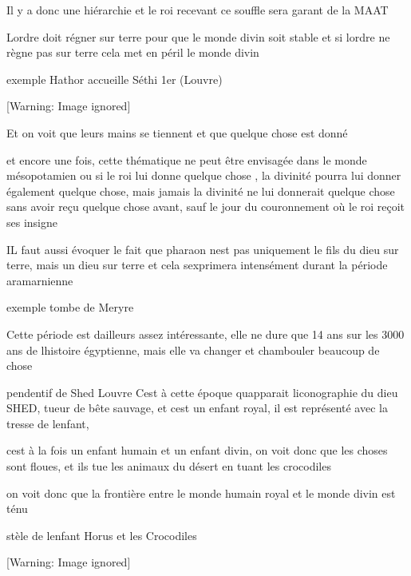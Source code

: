 \documentclass{article}
\begin{document}
Il y a donc une hiérarchie et le roi recevant ce souffle sera garant de
la MAAT

L{\textquotesingle}ordre doit régner sur terre pour que le monde divin
soit stable et si l{\textquotesingle}ordre ne règne pas sur terre cela
met en péril le monde divin

exemple Hathor accueille Séthi 1er (Louvre)

  [Warning: Image ignored] %
 

Et on voit que leurs mains se tiennent et que quelque chose est donné

et encore une fois, cette thématique ne peut être envisagée dans le
monde mésopotamien ou si le roi lui donne quelque chose , la divinité
pourra lui donner également quelque chose,  mais jamais la divinité ne
lui donnerait quelque chose sans avoir reçu quelque chose avant, sauf
le jour du couronnement où le roi reçoit ses insigne

IL faut aussi évoquer le fait que pharaon n{\textquotesingle}est pas
uniquement le fils du dieu sur terre, mais un dieu sur terre  et cela
s{\textquotesingle}exprimera intensément durant la période aramarnienne


exemple tombe de Meryre

Cette période est d{\textquotesingle}ailleurs assez intéressante, elle
ne dure que 14 ans sur les 3000 ans de l{\textquotesingle}histoire
égyptienne, mais elle va changer et chambouler beaucoup de chose

pendentif de Shed Louvre  C{\textquotesingle}est à cette époque
qu{\textquotesingle}apparait l{\textquotesingle}iconographie du dieu
SHED, tueur de bête sauvage, et c{\textquotesingle}est un enfant royal,
il est représenté avec la tresse de l{\textquotesingle}enfant, 

c{\textquotesingle}est à la fois un enfant humain et un enfant divin, on
voit donc que les choses sont floues, et ils tue les animaux du désert
en tuant les crocodiles

on voit donc que la frontière entre le monde humain royal et le monde
divin est ténu

stèle de l{\textquotesingle}enfant Horus et les Crocodiles

  [Warning: Image ignored] %
 
\end{document}
